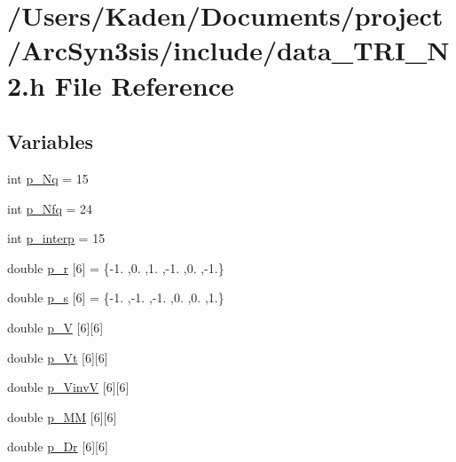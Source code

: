 \hypertarget{a00449}{}\section{/\+Users/\+Kaden/\+Documents/project/\+Arc\+Syn3sis/include/data\+\_\+\+T\+R\+I\+\_\+\+N2.h File Reference}
\label{a00449}
\subsection*{Variables}
\begin{DoxyCompactItemize}
\item 
int \hyperlink{a00449_a207fd9268dfef5bf1505928a4f4c774a}{p\+\_\+\+Nq} = 15
\item 
int \hyperlink{a00449_aa030b0a9fe619a48647119bacea600e0}{p\+\_\+\+Nfq} = 24
\item 
int \hyperlink{a00449_a240743866e0fdfc2ade414eedd98fde2}{p\+\_\+interp} = 15
\item 
double \hyperlink{a00449_a0df60dbb73098f125698cce08e503a6e}{p\+\_\+r} \mbox{[}6\mbox{]} = \{-\/1. ,0. ,1. ,-\/1. ,0. ,-\/1.\}
\item 
double \hyperlink{a00449_abd6b88b486d17d00eeac3a5cb31cda5a}{p\+\_\+s} \mbox{[}6\mbox{]} = \{-\/1. ,-\/1. ,-\/1. ,0. ,0. ,1.\}
\item 
double \hyperlink{a00449_afe4548e68ef5e0d69ce742335c373bc2}{p\+\_\+V} \mbox{[}6\mbox{]}\mbox{[}6\mbox{]}
\item 
double \hyperlink{a00449_aa6bad8dc5fb3243e265e9ebb9061cdcc}{p\+\_\+\+Vt} \mbox{[}6\mbox{]}\mbox{[}6\mbox{]}
\item 
double \hyperlink{a00449_a8f4f56c14261cc0dbe3d7d7856f58be7}{p\+\_\+\+VinvV} \mbox{[}6\mbox{]}\mbox{[}6\mbox{]}
\item 
double \hyperlink{a00449_a2a5e7e98c7e6e147342b0fa97b2f1f5a}{p\+\_\+\+MM} \mbox{[}6\mbox{]}\mbox{[}6\mbox{]}
\item 
double \hyperlink{a00449_ae285bac3d0e41f5e7cf51bbd552fd453}{p\+\_\+\+Dr} \mbox{[}6\mbox{]}\mbox{[}6\mbox{]}
\item 

\end{DoxyCompactItemize}
